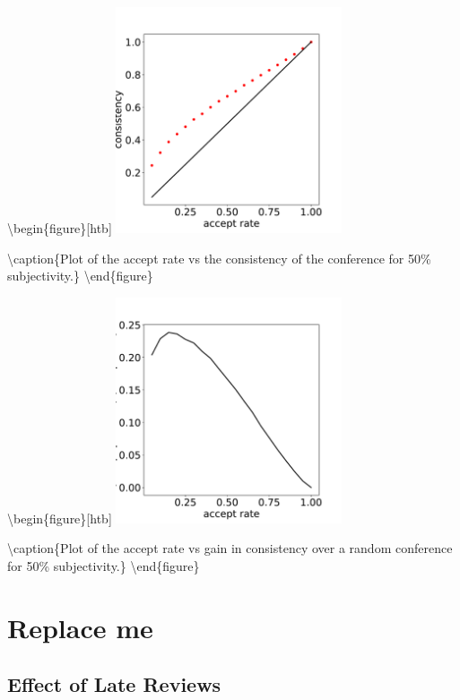 \textbackslash begin\{figure\}{[}htb{]}
\includegraphics[width=0.50\textwidth]{diagrams/neurips/consistency-vs-accept-rate.pdf}

\textbackslash caption\{Plot of the accept rate vs the consistency of
the conference for 50\% subjectivity.\}
\label{consistency-vs-accept-rate} \textbackslash end\{figure\}

\textbackslash begin\{figure\}{[}htb{]}
\includegraphics[width=0.50\textwidth]{diagrams/neurips/gain-in-consistency.pdf}

\textbackslash caption\{Plot of the accept rate vs gain in consistency
over a random conference for 50\% subjectivity.\}
\label{gain-in-consistency} \textbackslash end\{figure\}

\hypertarget{replace-me}{%
\section{Replace me}\label{replace-me}}

\hypertarget{effect-of-late-reviews}{%
\subsection{Effect of Late Reviews}\label{effect-of-late-reviews}}

